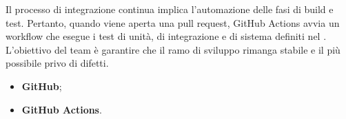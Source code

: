 \par Il processo di integrazione continua implica l’automazione delle fasi di build e test. Pertanto, quando viene aperta una pull request, GitHub Actions avvia un workflow che esegue i test di unità, di integrazione e di sistema definiti nel \PianoDiQualifica. L’obiettivo del team è garantire che il ramo di sviluppo rimanga stabile e il più possibile privo di difetti.

\begin{itemize}
  \item \textbf{GitHub};
  \item \textbf{GitHub Actions}.
\end{itemize}
